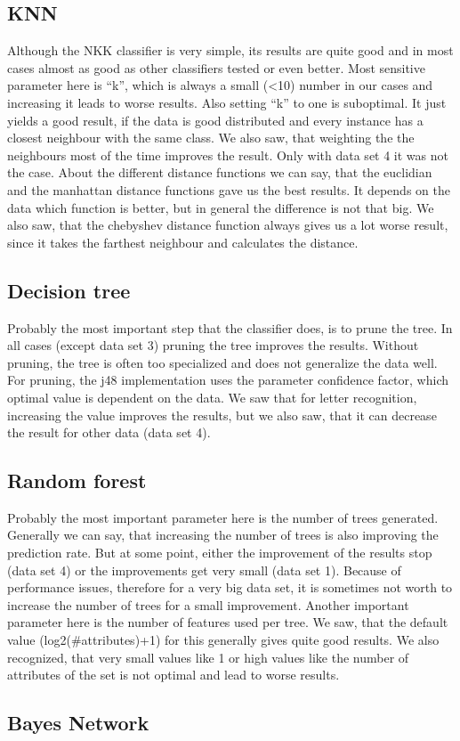 \documentclass{article}
\begin{document}
\subsection{KNN}

Although the NKK classifier is very simple, its results are quite good and in most cases almost as good as other classifiers tested or even better. Most sensitive parameter here is “k”, which is always a small (\textless10) number in our cases and increasing it leads to worse results. Also setting “k” to one is suboptimal. It just yields a good result, if the data is good distributed and every instance has a closest neighbour with the same class. We also saw, that weighting the the neighbours most of the time improves the result. Only with data set 4 it was not the case. About the different distance functions we can say, that the euclidian and the manhattan distance functions gave us the best results. It depends on the data which function is better, but in general the difference is not that big. We also saw, that the chebyshev distance function always gives us a lot worse result, since it takes the farthest neighbour and calculates the distance. 


\subsection{Decision tree}

Probably the most important step that the classifier does, is to prune the tree. In all cases (except data set 3) pruning the tree improves the results. Without pruning, the tree is often too specialized and does not generalize the data well. For pruning, the j48 implementation uses the parameter confidence factor, which optimal value is dependent on the data. We saw that for letter recognition, increasing the value improves the results, but we also saw, that it can decrease the result for other data (data set 4). 

\subsection{Random forest}

Probably the most important parameter here is the number of trees generated. Generally we can say, that increasing the number of trees is also improving the prediction rate. But at some point, either the improvement of the results stop (data set 4) or the improvements get very small (data set 1). Because of performance issues, therefore for a very big data set, it is sometimes not worth to increase the number of trees for a small improvement.
Another important parameter here is the number of features used per tree. We saw, that the default value (log2(\#attributes)+1) for this generally gives quite good results. We also recognized, that very small values like 1 or high values like the number of attributes of the set is not optimal and lead to worse results. 

\subsection{Bayes Network}
\end{document}
